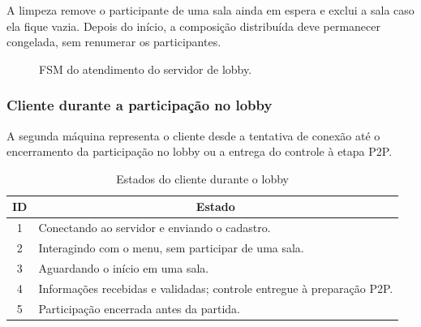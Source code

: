\documentclass[11pt,a4paper]{article}
\begin{document}
A limpeza remove o participante de uma sala ainda em espera e exclui a sala caso ela fique vazia. Depois do início, a composição distribuída deve permanecer congelada, sem renumerar os participantes.

\begin{figure}[H]
    \centering
    \caption{FSM do atendimento do servidor de lobby.}
    \label{fig:fsm_servidor}
\end{figure}

\subsubsection{Cliente durante a participação no lobby}

A segunda máquina representa o cliente desde a tentativa de conexão até o encerramento da participação no lobby ou a entrega do controle à etapa P2P.

\begin{table}[H]
    \centering
    \caption{Estados do cliente durante o lobby}
    \label{tab:fsm_cliente_lobby_estados}
    \begin{tabular}{|c|p{11.7cm}|}
        \hline
        \textbf{ID} & \multicolumn{1}{c|}{\textbf{Estado}} \\ \hline
        1 & Conectando ao servidor e enviando o cadastro. \\ \hline
        2 & Interagindo com o menu, sem participar de uma sala. \\ \hline
        3 & Aguardando o início em uma sala. \\ \hline
        4 & Informações recebidas e validadas; controle entregue à preparação P2P. \\ \hline
        5 & Participação encerrada antes da partida. \\ \hline
    \end{tabular}
\end{table}
\end{document}
